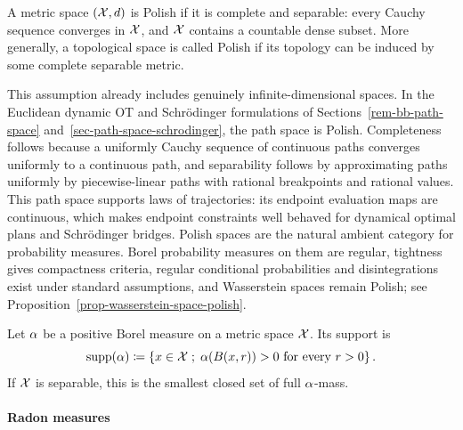 \begin{defn}\label{def-polish-metric-space}
	A metric space $(\mathcal{X},d)$ is Polish if it is complete and separable: every Cauchy sequence converges in $\mathcal{X}$, and $\mathcal{X}$ contains a countable dense subset. More generally, a topological space is called Polish if its topology can be induced by some complete separable metric.
\end{defn}
This assumption already includes genuinely infinite-dimensional spaces. In the Euclidean dynamic OT and Schr\"odinger formulations of Sections~\ref{rem-bb-path-space} and~\ref{sec-path-space-schrodinger}, the path space
is Polish. Completeness follows because a uniformly Cauchy sequence of continuous paths converges uniformly to a continuous path, and separability follows by approximating paths uniformly by piecewise-linear paths with rational breakpoints and rational values. This path space supports laws of trajectories: its endpoint evaluation maps are continuous, which makes endpoint constraints well behaved for dynamical optimal plans and Schr\"odinger bridges.
Polish spaces are the natural ambient category for probability measures. Borel probability measures on them are regular, tightness gives compactness criteria, regular conditional probabilities and disintegrations exist under standard assumptions, and Wasserstein spaces remain Polish; see Proposition~\ref{prop-wasserstein-space-polish}.

\begin{defn}\label{def:support}
	Let $\alpha$ be a positive Borel measure on a metric space $\mathcal{X}$. Its support is
	\[
		\operatorname{supp}(\alpha)
		\coloneqq
		\left\{ x\in\mathcal{X} \;;\; \alpha(B(x,r))>0\text{ for every }r>0 \right\}.
	\]
	If $\mathcal{X}$ is separable, this is the smallest closed set of full $\alpha$-mass.
\end{defn}


\paragraph{Radon measures}

